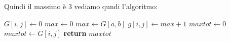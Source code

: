 \documentclass[a4paper,12pt, oneside]{book}
\begin{document}
Quindi il massimo è 3
\newpage
vediamo qundi l'algoritmo:
\begin{shaded}
  \begin{algorithmic}
    \State $G[i,j]\gets 0$
    \Else
    \State $max\gets 0$
    \State $max \gets G[a,b]$
    \EndIf
    \EndFor
    \EndFor
    \State $g[i,j] \gets max +1$
    \EndIf
    \EndFor
    \EndFor
    \State $maxtot \gets 0$
    \State $maxtot \gets G[i,j]$
    \EndIf
    \EndFor
    \EndFor
    \State \textbf{return} $maxtot$
    \EndFunction
  \end{algorithmic}
\end{shaded}
\newpage
\end{document}
